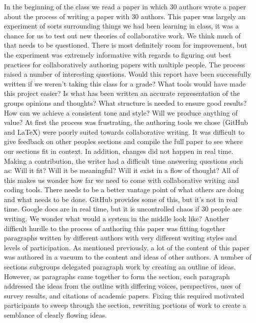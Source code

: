 In the beginning of the class we read a paper \cite{Tomlinson2012} in which 30 authors wrote a paper about the process of writing a paper with 30 authors. This paper was largely an experiment of sorts surrounding things we had been learning in class, it was a chance for us to test out new theories of collaborative work.
We think much of that needs to be questioned. There is most definitely room for improvement, but the experiment was extremely informative with regards to figuring out best practices for collaboratively authoring papers with multiple people.  
The process raised a number of interesting questions.
Would this report have been successfully written if we weren't taking this class for a grade?
What tools would have made this project easier? 
Is what has been written an accurate representation of the groups opinions and thoughts? 
What structure is needed to ensure good results?
How can we achieve a consistent tone and style? 
Will we produce anything of value?
At first the process was frustrating, the authoring tools we chose (GitHub and LaTeX) were poorly suited towards collaborative writing. It was difficult to give feedback on other peoples sections and compile the full paper to see where our sections fit in context. In addition, changes did not happen in real time. Making a contribution, the writer had a difficult time answering questions such as: Will it fit? Will it be meaningful? Will it exist in a flow of thought? All of this makes us wonder how far we need to come with collaborative writing and coding tools. There needs to be a better vantage point of what others are doing and what needs to be done. GitHub provides some of this, but it's not in real time. Google docs are in real time, but it is uncontrolled chaos if 30 people are writing. We wonder what would a system in the middle look like? 
Another difficult hurdle to the process of authoring this paper was fitting together paragraphs written by different authors with very different writing styles and levels of participation. As mentioned previously, a lot of the content of this paper was authored in a vacuum to the content and ideas of other authors. A number of sections subgroups delegated paragraph work by creating an outline of ideas. However, as paragraphs came together to form the section, each paragraph addressed the ideas from the outline with differing voices, perspectives, uses of survey results, and citations of academic papers. Fixing this required motivated participants to sweep through the section, rewriting portions of work to create a semblance of clearly flowing ideas.

